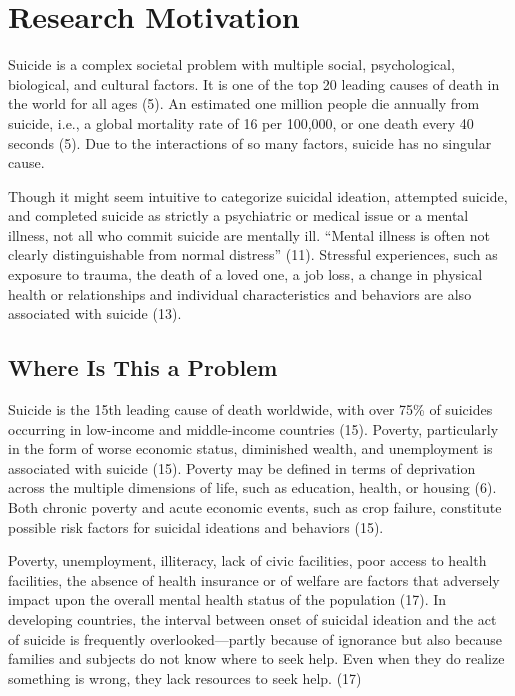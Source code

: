 \documentclass[]{article}
\begin{document}
\section{Research Motivation}\label{research-motivation}

Suicide is a complex societal problem with multiple social,
psychological, biological, and cultural factors. It is one of the top 20
leading causes of death in the world for all ages (5). An estimated one
million people die annually from suicide, i.e., a global mortality rate
of 16 per 100,000, or one death every 40 seconds (5). Due to the
interactions of so many factors, suicide has no singular cause.

Though it might seem intuitive to categorize suicidal ideation,
attempted suicide, and completed suicide as strictly a psychiatric or
medical issue or a mental illness, not all who commit suicide are
mentally ill. ``Mental illness is often not clearly distinguishable from
normal distress'' (11). Stressful experiences, such as exposure to
trauma, the death of a loved one, a job loss, a change in physical
health or relationships and individual characteristics and behaviors are
also associated with suicide (13).

\subsection{Where Is This a Problem}\label{where-is-this-a-problem}

Suicide is the 15th leading cause of death worldwide, with over 75\% of
suicides occurring in low-income and middle-income countries (15).
Poverty, particularly in the form of worse economic status, diminished
wealth, and unemployment is associated with suicide (15). Poverty may be
defined in terms of deprivation across the multiple dimensions of life,
such as education, health, or housing (6). Both chronic poverty and
acute economic events, such as crop failure, constitute possible risk
factors for suicidal ideations and behaviors (15).

Poverty, unemployment, illiteracy, lack of civic facilities, poor access
to health facilities, the absence of health insurance or of welfare are
factors that adversely impact upon the overall mental health status of
the population (17). In developing countries, the interval between onset
of suicidal ideation and the act of suicide is frequently
overlooked---partly because of ignorance but also because families and
subjects do not know where to seek help. Even when they do realize
something is wrong, they lack resources to seek help. (17)
\end{document}
